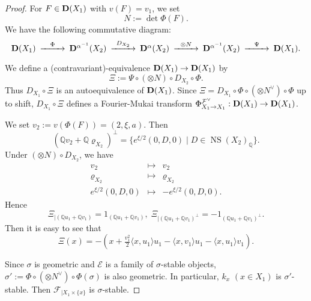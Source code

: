 \documentclass[leqno,11pt]{amsart}
\def\Q{\ensuremath{\mathbb{Q}}}
\def\NS{\mathop{\mathrm{NS}}\nolimits}
\theoremstyle{definition}
\def\Q{\ensuremath{\mathbb{Q}}}
\def\EE{\ensuremath{\mathcal E}}
\def\FF{\ensuremath{\mathcal F}}
\begin{document}
\begin{proof}
For $F \in {\bf D}(X_1)$ with $v(F)=v_1$,
we set
\begin{equation}
N:=\det \Phi(F).
\end{equation}
We have the following commutative diagram:
\begin{equation}
\begin{CD}
{\bf D}(X_1) @>{\Phi}>> {\bf D}^{\alpha^{-1}}(X_2) @>{D_{X_2}}>> 
{\bf D}^{\alpha}(X_2)  
@>{\otimes N}>>{\bf D}^{\alpha^{-1}}(X_2)@>{\Psi}>>  {\bf D}(X_1).
\end{CD}
\end{equation}

We define a (contravariant)-equivalence
${\bf D}(X_1) \to {\bf D}(X_1)$ by
\begin{equation}
\Xi:=\Psi \circ(\otimes N) \circ D_{X_2} \circ \Phi.
\end{equation}
Thus
$D_{X_1} \circ \Xi$ is an autoequivalence of ${\bf D}(X_1)$. 
Since
$\Xi=D_{X_1} \circ \Phi \circ(\otimes N^{\vee})  \circ \Phi$
up to shift,
$D_{X_1} \circ \Xi$ defines a Fourier-Mukai transform
$\Phi_{X_1 \to X_1}^{\FF^{\vee}}:{\bf D}(X_1) \to {\bf D}(X_1)$.


We set
$v_2:=v(\Phi(F))=(2,\xi,a)$.
Then
$$
(\Q v_2+\Q \varrho_{X_2})^\perp=\{e^{\xi/2}(0,D,0) \mid D \in \NS(X_2)_{\Q}\}.
$$
Under $(\otimes N) \circ D_{X_2}$, we have
\begin{equation}
\begin{matrix}
v_2 & \mapsto & v_2\\
\varrho_{X_2} & \mapsto & \varrho_{X_2}\\
e^{\xi/2}(0,D,0) & \mapsto & -e^{\xi/2}(0,D,0).
\end{matrix}
\end{equation}
Hence
\begin{equation}
\Xi_{|(\Q u_1+\Q v_1)}=1_{(\Q u_1+\Q v_1)},\;
\Xi_{|(\Q u_1+\Q v_1)^\perp}=-1_{(\Q u_1+\Q v_1)^\perp}.
\end{equation}
Then it is easy to see that
\begin{equation}
\Xi(x)=-(x+\tfrac{v_1^2}{2} \langle x,u_1 \rangle u_1-
\langle x,v_1 \rangle u_1-
\langle x,u_1 \rangle v_1).
\end{equation}

Since $\sigma$ is geometric and $\EE$ is a family of $\sigma$-stable objects,
$\sigma':=\Phi \circ(\otimes N^{\vee}) \circ \Phi(\sigma)$ is also geometric.
In particular, $k_x$ $(x \in X_1)$ is $\sigma'$-stable.
Then $\FF_{|X_1 \times \{ x\}}$ is $\sigma$-stable.  
\end{proof}
\end{document}
